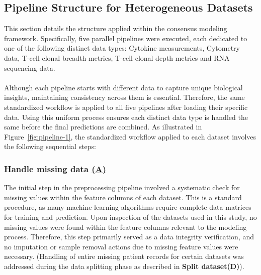 \documentclass[12pt,a4paper]{report}
\begin{document}
\subsection{Pipeline Structure for Heterogeneous Datasets}
\label{subsec:pipeline_structure_for_heterogeneous_datasets}
\noindent
This section details the structure applied within the consensus modeling framework. Specifically, five parallel pipelines were executed, each dedicated to one of the following distinct data types:
Cytokine measurements, Cytometry data, T-cell clonal breadth metrics, T-cell clonal depth metrics and RNA sequencing data.\\
\\
Although each pipeline starts with different data to capture unique biological insights, maintaining consistency across them is essential. Therefore, the same standardized workflow is applied to all five pipelines after loading their specific data. Using this uniform process ensures each distinct data type is handled the same before the final predictions are combined. As illustrated in Figure~\ref{fig:pipeline-1}, the standardized workflow applied to each dataset involves the following sequential steps:

\subsubsection*{Handle missing data \hyperref[fig:pipeline-1]{(A)}}
The initial step in the preprocessing pipeline involved a systematic check for missing values within the feature columns of each dataset. This is a standard procedure, as many machine learning algorithms require complete data matrices for training and prediction. Upon inspection of the datasets used in this study, no missing values were found within the feature columns relevant to the modeling process. Therefore, this step primarily served as a data integrity verification, and no imputation or sample removal actions due to missing feature values were necessary. (Handling of entire missing patient records for certain datasets was addressed during the data splitting phase as described in \textbf{{Split dataset(D)}}).
\end{document}
